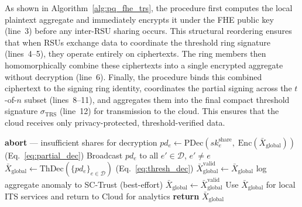 \documentclass[12pt, a4paper]{report}
\begin{document}
As shown in Algorithm~\ref{alg:pq_fhe_trs}, the procedure first computes the
local plaintext aggregate and immediately encrypts it under the FHE public key
(line~3) before any inter-RSU sharing occurs. This structural reordering ensures
that when RSUs exchange data to coordinate the threshold ring signature
(lines~4--5), they operate entirely on ciphertexts. The ring members then
homomorphically combine these ciphertexts into a single encrypted aggregate
without decryption (line~6). Finally, the procedure binds this combined
ciphertext to the signing ring identity, coordinates the partial signing across
the $t$-of-$n$ subset (lines~8--11), and aggregates them into the final compact
threshold signature $\sigma_{\mathrm{TRS}}$ (line~12) for transmission to the
cloud. This ensures that the cloud receives only privacy-protected,
threshold-verified data.


\begin{algorithm}[htb]
\caption{Threshold FHE Decryption at RSU Cluster
(\texttt{THRESH-DEC})}
\begin{algorithmic}[1]
  \small
    \State \textbf{abort} --- insufficient shares for
           decryption
  \EndIf
    \State $pd_e \gets \mathrm{PDec}(sk_e^{\mathrm{share}},\;
           \mathrm{Enc}(\bar{X}_{\mathrm{global}}))$
           \hfill (Eq.~\eqref{eq:partial_dec})
    \State Broadcast $pd_e$ to all $e' \in \mathcal{D}$,
           $e' \neq e$
  \EndFor
  \State $\bar{X}_{\mathrm{global}} \gets
         \mathrm{ThDec}(\{pd_e\}_{e \in \mathcal{D}})$
         \hfill (Eq.~\eqref{eq:thresh_dec})
    \State $\bar{X}_{\mathrm{global}}^{\mathrm{valid}} \gets
           \bar{X}_{\mathrm{global}}$
  \Else
    \State log aggregate anomaly to SC-Trust (best-effort)
    \State $\bar{X}_{\mathrm{global}} \gets
           \bar{X}_{\mathrm{global}}^{\mathrm{valid}}$
  \EndIf
  \State Use $\bar{X}_{\mathrm{global}}$ for local ITS
         services and return to Cloud for analytics
  \State \textbf{return} $\bar{X}_{\mathrm{global}}$
  \EndProcedure
\end{algorithmic}
\label{alg:thresh_dec}
\end{algorithm}
\end{document}
